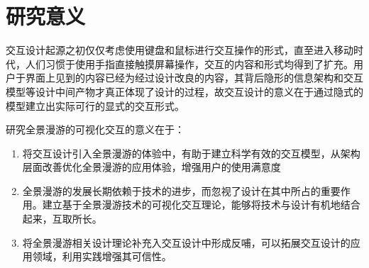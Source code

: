 \section{研究意义}
交互设计起源之初仅仅考虑使用键盘和鼠标进行交互操作的形式，直至进入移动时代，人们习惯于使用手指直接触摸屏幕操作，交互的内容和形式均得到了扩充。用户于界面上见到的内容已经为经过设计改良的内容，其背后隐形的信息架构和交互模型等设计中间产物才真正体现了设计的过程，故交互设计的意义在于通过隐式的模型建立出实际可行的显式的交互形式。

研究全景漫游的可视化交互的意义在于：
\begin{enumerate}
	\item 将交互设计引入全景漫游的体验中，有助于建立科学有效的交互模型，从架构层面改善优化全景漫游的应用体验，增强用户的使用满意度
	\item 全景漫游的发展长期依赖于技术的进步，而忽视了设计在其中所占的重要作用。建立基于全景漫游技术的可视化交互理论，能够将技术与设计有机地结合起来，互取所长。
	\item 将全景漫游相关设计理论补充入交互设计中形成反哺，可以拓展交互设计的应用领域，利用实践增强其可信性。
\end{enumerate}

